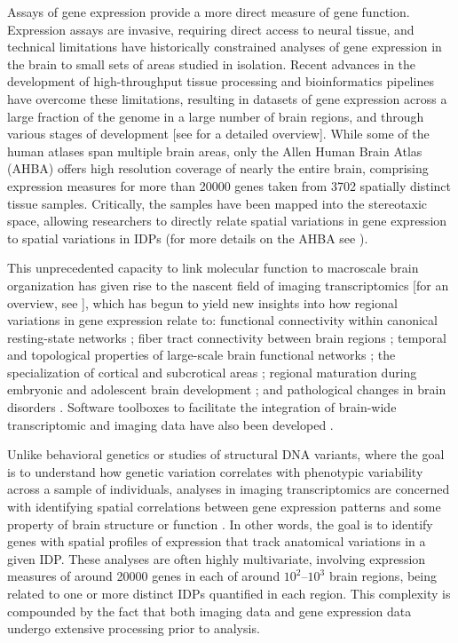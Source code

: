 \documentclass[10pt,A4]{article}
\begin{document}
Assays of gene expression provide a more direct measure of gene function. Expression assays are invasive, requiring direct access to neural tissue, and technical limitations have historically constrained analyses of gene expression in the brain to small sets of areas studied in isolation. Recent advances in the development of high-throughput tissue processing and bioinformatics pipelines have overcome these limitations, resulting in datasets of gene expression across a large fraction of the genome in a large number of brain regions, and through various stages of development [see \citet{Keil2018} for a detailed overview]. While some of the human atlases span multiple brain areas, only the Allen Human Brain Atlas (AHBA) offers high resolution coverage of nearly the entire brain, comprising expression measures for more than \num{20000} genes taken from \num{3702} spatially distinct tissue samples. Critically, the samples have been mapped into the stereotaxic space, allowing researchers to directly relate spatial variations in gene expression to spatial variations in IDPs (for more details on the AHBA see ).

This unprecedented capacity to link molecular function to macroscale brain organization has given rise to the nascent field of imaging transcriptomics [for an overview, see \citep{Fornito2018}], which has begun to yield new insights into how regional variations in gene expression relate to: functional connectivity within canonical resting-state networks \citep{Richiardi2015,Forest2017};
fiber tract connectivity between brain regions \citep{Goel2014};
temporal and topological properties of large-scale brain functional networks \citep{Cioli2014b,Vertes2016b};
the specialization of cortical and subcrotical areas \citep{Krienen2016,Parkes2017,Anderson2018};
regional maturation during embryonic and adolescent brain development \citep{Kirsch2016a,Whitaker2016a};
and pathological changes in brain disorders \citep{Rittman2016,Romme2017,McColgan2018,Romero-Garcia2018a}. Software toolboxes to facilitate the integration of brain-wide transcriptomic and imaging data have also been developed \citep{French2015,Gorgolewski2015,Rizzo2016,Rittman2017}.

Unlike behavioral genetics or studies of structural DNA variants, where the goal is to understand how genetic variation correlates with phenotypic variability across a sample of individuals, analyses in imaging transcriptomics are concerned with identifying spatial correlations between gene expression patterns and some property of brain structure or function \citep{Fornito2018}. In other words, the goal is to identify genes with spatial profiles of expression that track anatomical variations in a given IDP. These analyses are often highly multivariate, involving expression measures of around \num{20000} genes in each of around $10^{2}–10^{3}$ brain regions, being related to one or more distinct IDPs quantified in each region. This complexity is compounded by the fact that both imaging data and gene expression data undergo extensive processing prior to analysis.
\end{document}
